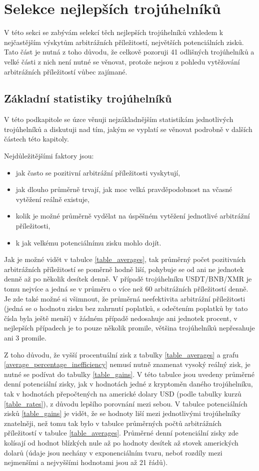 \documentclass[thesis=B,czech]{FITthesis}[2019/03/21]
\begin{document}
\section{Selekce nejlepších trojúhelníků}
V této sekci se zabývám selekcí těch nejlepších trojúhelníků vzhledem k nejčastějším výskytům arbitrážních příležitostí, největších potenciálních zisků. Tato část je nutná z toho důvodu, že celkově pozoruji 41 odlišných trojúhelníků a velké části z nich není nutné se věnovat, protože nejsou z pohledu vytěžování arbitrážních příležitostí vůbec zajímané.

\subsection{Základní statistiky trojúhelníků}
V této podkapitole se úzce věnuji nejzákladnějším statistikám jednotlivých trojúhelníků a diskutuji nad tím, jakým se vyplatí se věnovat podrobně v dalších částech této kapitoly.

Nejdůležitějšími faktory jsou: 
\begin{itemize}
    \item jak často se pozitivní arbitrážní příležitosti vyskytují,
    \item jak dlouho průměrně trvají, jak moc velká pravděpodobnost na včasné vytěžení reálně existuje,
    \item kolik je možné průměrně vydělat na úspěšném vytěžení jednotlivé arbitrážní příležitosti,
    \item k jak velkému potenciálnímu zisku mohlo dojít.
\end{itemize}
Jak je možné vidět v tabulce \ref{table_averages}, tak průměrný počet pozitivních arbitrážních příležitostí se poměrně hodně liší, pohybuje se od ani ne jednotek denně až po několik desítek denně. V případě trojúhelníku USDT/BNB/XMR je tomu nejvíce a jedná se v průměru o více než 60 arbitrážních příležitostí denně. Je zde také možné si všimnout, že průměrná neefektivita arbitrážní příležitosti (jedná se o hodnotu zisku bez zahrnutí poplatků, s odečtením poplatků by tato čísla byla ještě menší) v žádném případě nedosahuje ani jednotek procent, v nejlepších případech je to pouze několik promile, většina trojúhelníků nepřesahuje ani 3 promile.

Z toho důvodu, že vyšší procentuální zisk z tabulky \ref{table_averages} a grafu \ref{average_percentage_inefficiency} nemusí nutně znamenat vysoký reálný zisk, je nutné se podívat do tabulky \ref{table_gains}. V této tabulce jsou uvedeny průměrné denní potenciální zisky, jak v hodnotách jedné z kryptoměn daného trojúhelníku, tak v hodnotách přepočtených na americké dolary USD (podle tabulky kurzů \ref{table_rates}), z důvodu lepšího porovnání mezi sebou. V tabulce potenciálních zisků \ref{table_gains} je vidět, že se hodnoty liší mezi jednotlivými trojúhelníky znatelněji, než tomu tak bylo v tabulce průměrných počtů arbitrážních příležitostí v tabulce \ref{table_averages}. Průměrné denní potenciální zisky zde kolísají od hodnot blízkých nule až po hodnoty desítek až stovek amerických dolarů (údaje jsou nechány v exponenciálním tvaru, neboť rozdíly mezi nejmenšími a nejvyššími hodnotami jsou až 21 řádů). 
\end{document}
